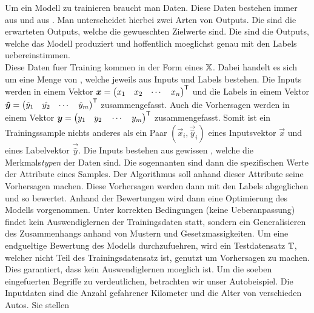 \documentclass[../main]{subfiles}
\begin{document}
Um ein Modell zu trainieren braucht man Daten. Diese Daten bestehen immer aus
 und aus . Man unterscheidet hierbei zwei Arten
von Outputs. Die  sind die erwarteten Outputs, welche die
gewueschten Zielwerte sind. Die  sind die Outputs, welche
das Modell produziert und hoffentlich moeglichst genau mit den Labels
uebereinstimmen. \\
Diese Daten fuer Training kommen in der Form eines  $\mathbb{X}$.
Dabei handelt es sich um eine Menge von ,
welche jeweils aus Inputs und Labels bestehen.
Die Inputs werden in einem Vektor
$\bm{x} = \begin{pmatrix} x_1 & x_2 & \cdots & x_n \end{pmatrix}^{\mathsf{T}}$
und die Labels in einem Vektor
$\bm{\hat{y}} = \begin{pmatrix} \hat{y}_1 & \hat{y_2} & \cdots & \hat{y}_m \end{pmatrix}^{\mathsf{T}}$
zusammengefasst. Auch die Vorhersagen werden in einem Vektor
$\bm{y} = \begin{pmatrix} y_1 \quad y_2 \quad \cdots \quad y_m \end{pmatrix}^{\mathsf{T}}$
zusammengefasst.
Somit ist ein Trainingssample nichts anderes als ein Paar
$(\vec{x}_i,\vec{\hat{y}}_i)$ eines Inputsvektor $\vec{x}$ und eines Labelvektor
$\vec{\hat{y}}$.
\para{}
Die Inputs bestehen aus gewissen , welche die
Merkmals\textit{typen} der Daten sind. Die sogennanten  sind
dann die spezifischen Werte der Attribute eines Samples. Der Algorithmus soll
anhand dieser Attribute seine Vorhersagen machen.
Diese Vorhersagen werden dann mit den Labels abgeglichen und so bewertet.
Anhand der Bewertungen wird dann eine Optimierung des Modells vorgenommen.
Unter korrekten Bedingungen (keine Ueberanpassung) findet kein Auswendiglernen der Trainingsdaten statt,
sondern ein Generalisieren des Zusammenhangs anhand von Mustern und Gesetzmassigkeiten.
\para{}
Um eine endgueltige Bewertung des Modells durchzufuehren, wird ein Testdatensatz
$\mathbb{T}$, welcher nicht Teil des Trainingsdatensatz ist, genutzt um Vorhersagen zu machen.
Dies garantiert, dass kein Auswendiglernen moeglich ist.
\para{}
Um die soeben eingefuerten Begriffe zu verdeutlichen, betrachten wir unser Autobeispiel.
Die Inputdaten sind die Anzahl gefahrener Kilometer und die Alter von
verschieden Autos. Sie stellen
\end{document}
